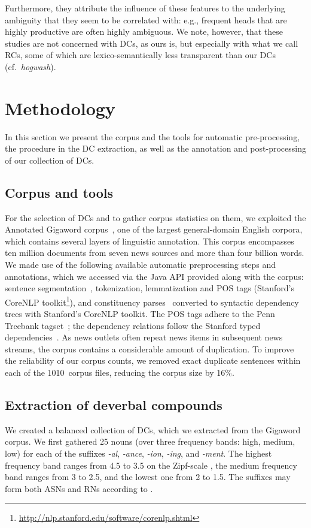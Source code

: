 \documentclass[output=paper]{langsci/langscibook}
\begin{document}
Furthermore, they attribute the influence of these features to the underlying  ambiguity that they seem to be correlated with: e.g., frequent heads that are highly productive are often highly ambiguous.  {We note, however, that these studies are not  concerned with DCs, as ours is, but especially with what we call RCs, some of which are lexico-semantically less transparent than our DCs (cf.~\textit{hogwash}).}




\section{Methodology}\label{sec:methodology}
In this section we present the corpus and the tools for automatic pre-processing, the procedure in the DC extraction, as well as the annotation and post-processing of our collection of DCs.
\subsection{Corpus and tools}
For the selection of DCs and to gather corpus statistics on them, we exploited the Annotated Gigaword corpus~\citep{Napoles:12}, one of the largest general-domain English corpora, which contains several layers of linguistic annotation. This corpus encompasses ten million documents from seven news sources and more than four billion words.                                      
We made use of the following available automatic preprocessing steps and annotations, which we accessed via the Java API provided along with the corpus: sentence segmentation~\citep{Gillick:09}, tokenization, lemmatization and POS tags (Stanford's CoreNLP toolkit\footnote{\url{http://nlp.stanford.edu/software/corenlp.shtml}}), and constituency parses~\citep{Huang:10} converted to syntactic dependency trees with Stanford's CoreNLP toolkit.
The POS tags adhere to the Penn Treebank tagset~\citep{Santorini:93}; the dependency relations follow the Stanford typed dependencies~\citep{Marneffe:08}.
As news outlets often repeat news items in subsequent news streams, the corpus contains a considerable amount of duplication. To improve the reliability of our corpus counts,  we removed exact duplicate sentences within each of the 1010~corpus files, reducing the corpus size by 16\%.


\subsection{Extraction of deverbal compounds}\label{sec:extraction:dcs}\largerpage
We created a balanced collection of DCs, which we extracted from the Gigaword corpus. We first gathered 25 nouns (over three frequency bands: high, medium, low) for each of the suffixes \textit{-al}, \textit{-ance}, \textit{-ion}, \textit{-ing}, and \textit{-ment}. The highest frequency band ranges from 4.5 to 3.5 on the Zipf-scale \citep{VanHeuven:2014}, the medium frequency band ranges from 3 to 2.5, and the lowest one from 2 to 1.5. 
The suffixes may form both ASNs and RNs according to \cite{grimshaw:90}. 
\end{document}
